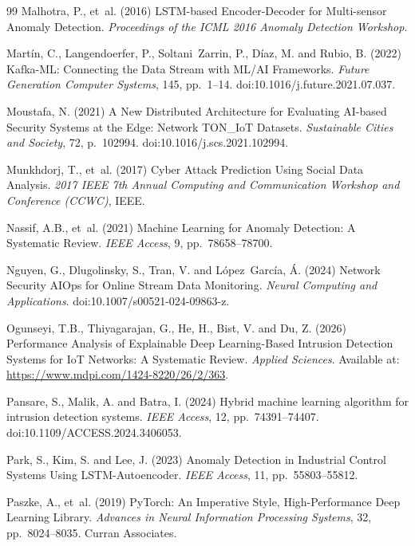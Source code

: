 \documentclass[12pt,a4paper]{report}
\begin{document}
\begin{thebibliography}{99}
Malhotra, P., et~al. (2016) LSTM-based Encoder-Decoder for Multi-sensor Anomaly Detection. \textit{Proceedings of the ICML 2016 Anomaly Detection Workshop}.

Mart\'{i}n, C., Langendoerfer, P., Soltani~Zarrin, P., D\'{i}az, M. and Rubio, B. (2022) Kafka-ML: Connecting the Data Stream with ML/AI Frameworks. \textit{Future Generation Computer Systems}, 145, pp.~1--14. doi:10.1016/j.future.2021.07.037.

Moustafa, N. (2021) A New Distributed Architecture for Evaluating AI-based Security Systems at the Edge: Network TON\_IoT Datasets. \textit{Sustainable Cities and Society}, 72, p.~102994. doi:10.1016/j.scs.2021.102994.

Munkhdorj, T., et~al. (2017) Cyber Attack Prediction Using Social Data Analysis. \textit{2017 IEEE 7th Annual Computing and Communication Workshop and Conference (CCWC)}, IEEE.

Nassif, A.B., et~al. (2021) Machine Learning for Anomaly Detection: A Systematic Review. \textit{IEEE Access}, 9, pp.~78658--78700.

Nguyen, G., Dlugolinsky, S., Tran, V. and L\'{o}pez~Garc\'{i}a, \'{A}. (2024) Network Security AIOps for Online Stream Data Monitoring. \textit{Neural Computing and Applications}. doi:10.1007/s00521-024-09863-z.

Ogunseyi, T.B., Thiyagarajan, G., He, H., Bist, V. and Du, Z. (2026) Performance Analysis of Explainable Deep Learning-Based Intrusion Detection Systems for IoT Networks: A Systematic Review. \textit{Applied Sciences}. Available at: \url{https://www.mdpi.com/1424-8220/26/2/363}.

Pansare, S., Malik, A. and Batra, I. (2024) Hybrid machine learning algorithm for intrusion detection systems. \textit{IEEE Access}, 12, pp.~74391--74407. doi:10.1109/ACCESS.2024.3406053.

Park, S., Kim, S. and Lee, J. (2023) Anomaly Detection in Industrial Control Systems Using LSTM-Autoencoder. \textit{IEEE Access}, 11, pp.~55803--55812.

Paszke, A., et~al. (2019) PyTorch: An Imperative Style, High-Performance Deep Learning Library. \textit{Advances in Neural Information Processing Systems}, 32, pp.~8024--8035. Curran Associates.


\end{thebibliography}
\end{document}
